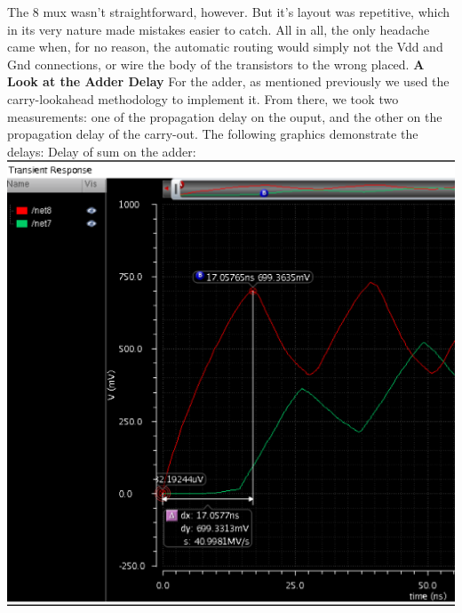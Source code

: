 \documentclass[12pt]{article}
\begin{document}
  \newline \newline
  The 8 mux wasn't straightforward, however. But it's layout was repetitive, which in its very nature 
  made mistakes easier to catch.
  \newline \newline
  All in all, the only headache came when, for no reason, the automatic routing would simply not the
  Vdd and Gnd connections, or wire the body of the transistors to the wrong placed. 
  \newline \newline
	\textbf{A Look at the Adder Delay}
  \newline \newline
  For the adder, as mentioned previously we used the carry-lookahead methodology to implement it.
  From there, we took two measurements: one of the propagation delay on the ouput, and the other on
  the propagation delay of the carry-out. The following graphics demonstrate the delays:
  \newline \newline
  \newline \newline
  Delay of sum on the adder:
  \newline \newline
  \newline \newline
  \includegraphics[scale=0.4]{delaysum.png} 
\end{document}
